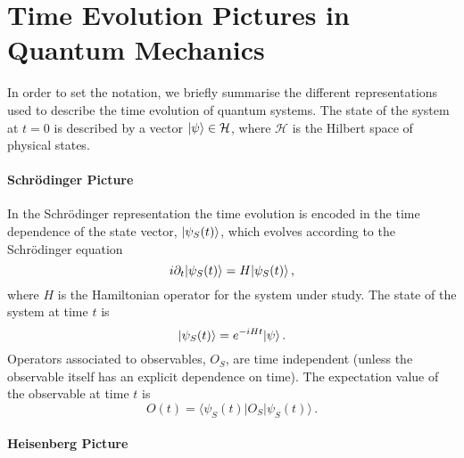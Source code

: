 \newcommand{\Hin}{\mathcal{H}_{\mathrm{in}}}
\newcommand{\matH}{\mathcal{H}}
\newcommand{\Dspace}{\scriptscriptstyle{D-1}}
\newcommand{\Dall}{\scriptscriptstyle{D}}
\newcommand{\instate}{\mathrm{in}}
\newcommand{\outstate}{\mathrm{out}}
\newcommand{\dddt}{\frac{\overleftrightarrow{\partial}}{\partial t}}

\section{Time Evolution Pictures in Quantum Mechanics}
\label{sec:reps-quant}

In order to set the notation, we briefly summarise the different representations
used to describe the time evolution of quantum systems. The state of the system
at $t=0$ is described by a vector $| \psi \rangle \in \mathcal{H}$, where
$\mathcal{H}$ is the Hilbert space of physical states.

\paragraph{Schr\"odinger Picture}

In the Schr\"odinger representation the time evolution is encoded in the time
dependence of the state vector, $| \psi_S(t) \rangle$, which evolves according to
the Schr\"odinger equation
\begin{equation}
    \label{eq:SchrodEq}
    i \partial_t | \psi_S(t) \rangle = H | \psi_S(t) \rangle\, ,
\end{equation}
where $H$ is the Hamiltonian operator for the system under study. The state of
the system at time $t$ is 
\begin{equation}
    \label{eq:SchrTimeEvol}
    | \psi_S(t) \rangle = e^{-i H t} | \psi \rangle\, .
\end{equation}
Operators
associated to observables, $O_S$, are time independent (unless the observable
itself has an explicit dependence on time). The expectation value of the
observable at time $t$ is 
\begin{equation}
    \label{eq:SchrodExp}
    O(t) = \langle \psi_S(t) | O_S | \psi_S(t) \rangle\, .
\end{equation}

\paragraph{Heisenberg Picture}

